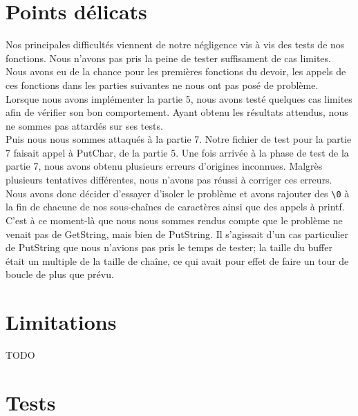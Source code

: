 \documentclass[a4paper]{article}
\newcommand*{\escape}[1]{\texttt{\textbackslash#1}}
\begin{document}
\newpage
\section{Points délicats}

Nos principales difficultés viennent de notre négligence vis à vis des tests de
nos fonctions. Nous n'avons pas pris la peine de tester suffisament de cas limites.
Nous avons eu de la chance pour les premières fonctions du devoir, les appels de
ces fonctions dans les parties suivantes ne nous ont pas posé de problème. \\

Lorsque nous avons implémenter la partie 5, nous avons testé quelques cas limites
afin de vérifier son bon comportement. Ayant obtenu les résultats attendus, nous
ne sommes pas attardés sur ses tests. \\

Puis nous nous sommes attaqués à la partie 7. Notre fichier de test pour la partie
7 faisait appel à PutChar, de la partie 5. Une fois arrivée à la phase de test de
la partie 7, nous avons obtenu plusieurs erreurs d'origines inconnues. Malgrès
plusieurs tentatives différentes, nous n'avons pas réussi à corriger ces erreurs.
Nous avons donc décider d'essayer d'isoler le problème et avons rajouter des \escape{0}
à la fin de chacune de nos sous-chaînes de caractères ainsi que des appels à printf.
C'est à ce moment-là que nous nous sommes rendus compte que le problème ne venait
pas de GetString, mais bien de PutString. Il s'agissait d'un cas particulier de
PutString que nous n'avions pas pris le temps de tester; la taille du buffer était
un multiple de la taille de chaîne, ce qui avait pour effet de faire un tour de boucle
de plus que prévu.



\section{Limitations}

TODO


\newpage
\section{Tests}
\end{document}
